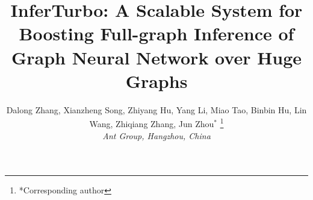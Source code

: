 \documentclass[conference]{IEEEtran}
\begin{document}
\title{InferTurbo: A Scalable System for Boosting Full-graph Inference of Graph Neural Network over Huge Graphs
}

\author{ 
	Dalong Zhang, Xianzheng Song, Zhiyang Hu, Yang Li, Miao Tao, Binbin Hu, Lin Wang, Zhiqiang Zhang, Jun Zhou$^{\ast}$ \thanks{*Corresponding author} \\
	\textit{Ant Group, Hangzhou, China}
}

\end{document}
